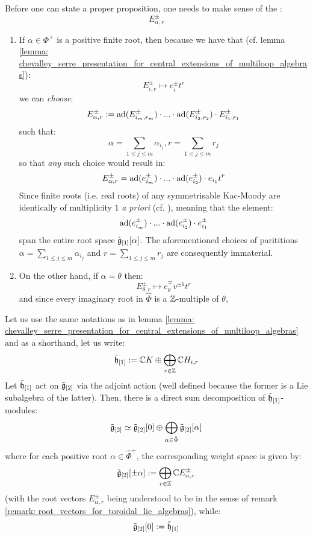         \begin{remark} \label{remark: root_vectors_for_toroidal_lie_algebras}
            Before one can state a proper proposition, one needs to make sense of the :
                $$E_{\alpha, r}^{\pm}$$
            \begin{enumerate}
                \item If $\alpha \in \Phi^+$ is a positive finite root, then because we have that (cf. lemma \ref{lemma: chevalley_serre_presentation_for_central_extensions_of_multiloop_algebras}):
                    $$E_{i, r}^{\pm} \mapsto e_i^{\pm} t^r$$
                we can \textit{choose}:
                    $$E_{\alpha, r}^{\pm} := \mathrm{ad}(E_{i_m, r_m}^{\pm}) \cdot ... \cdot \mathrm{ad}(E_{i_2, r_2}^{\pm}) \cdot E_{i_1, r_1}^{\pm}$$
                such that:
                    $$\alpha = \sum_{1 \leq j \leq m} \alpha_{i_j}, r = \sum_{1 \leq j \leq m} r_j$$
                so that \textit{any} such choice would result in:
                    $$E_{\alpha, r}^{\pm} = \mathrm{ad}(e_{i_m}^{\pm}) \cdot ... \cdot \mathrm{ad}(e_{i_2}^{\pm}) \cdot e_{i_1} t^r$$
                Since finite roots (i.e. real roots) of any symmetrisable Kac-Moody are identically of multiplicity $1$ \textit{a priori} (cf. \cite[Chapter 4]{kac_infinite_dimensional_lie_algebras}), meaning that the element:
                    $$\mathrm{ad}(e_{i_m}^{\pm}) \cdot ... \cdot \mathrm{ad}(e_{i_2}^{\pm}) \cdot e_{i_1}^{\pm}$$
                span the entire root space $\hat{\mathfrak{g}}_{[1]}[\alpha]$. The aforementioned choices of parititions $\alpha = \sum_{1 \leq j \leq m} \alpha_{i_j}$ and $r = \sum_{1 \leq j \leq m} r_j$ are consequently immaterial.
                
                \item On the other hand, if $\alpha = \theta$ then:
                    $$E_{\theta, r}^{\pm} \mapsto e_{\theta}^{\mp} v^{\pm 1} t^r$$
                and since every imaginary root in $\hat{\Phi}$ is a $\mathbb{Z}$-multiple of $\theta$, 
            \end{enumerate}
        \end{remark}
        \begin{proposition}
            Let us use the same notations as in lemma \ref{lemma: chevalley_serre_presentation_for_central_extensions_of_multiloop_algebras} and as a shorthand, let us write:
                $$\tilde{\mathfrak{h}}_{[1]} := \mathbb{C} K \oplus \bigoplus_{r \in \mathbb{Z}} \mathbb{C} H_{i, r}$$
            Let $\tilde{\mathfrak{h}}_{[1]}$ act on $\tilde{\mathfrak{g}}_{[2]}$ via the adjoint action (well defined because the former is a Lie subalgebra of the latter). Then, there is a direct sum decomposition of $\tilde{\mathfrak{h}}_{[1]}$-modules:
                $$\tilde{\mathfrak{g}}_{[2]} \simeq \tilde{\mathfrak{g}}_{[2]}[0] \oplus \bigoplus_{\alpha \in \hat{\Phi}} \tilde{\mathfrak{g}}_{[2]}[\alpha]$$
            where for each positive root $\alpha \in \hat{\Phi}^+$, the corresponding weight space is given by:
                $$\tilde{\mathfrak{g}}_{[2]}[\pm \alpha] := \bigoplus_{r \in \mathbb{Z}} \mathbb{C} E_{\alpha, r}^{\pm}$$
            (with the root vectors $E_{\alpha, r}^{\pm}$ being understood to be in the sense of remark \ref{remark: root_vectors_for_toroidal_lie_algebras}), while:
                $$\tilde{\mathfrak{g}}_{[2]}[0] := \tilde{\mathfrak{h}}_{[1]}$$
        \end{proposition}
